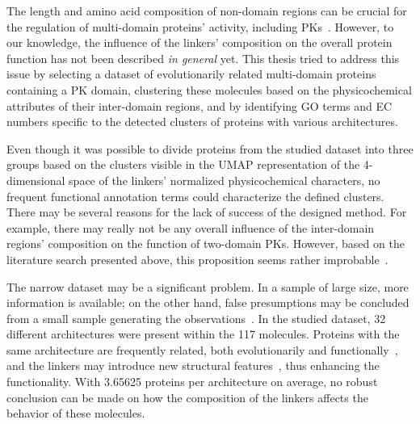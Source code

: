 \label{discussion}

The length and amino acid composition of non-domain regions can be crucial for the
regulation of multi-domain proteins' activity, including
PKs~\cite{gogl2019disordered, vigil2004conformational}.
However, to our knowledge, the influence of the linkers' composition on the overall
protein function has not been described \emph{in general} yet.
This thesis tried to address this issue by selecting a dataset of evolutionarily related
multi-domain proteins containing a PK domain, clustering these molecules based on the
physicochemical attributes of their inter-domain regions, and by identifying GO terms and
EC numbers specific to the detected clusters of proteins with various architectures.

Even though it was possible to divide proteins from the studied dataset into three groups
based on the clusters visible in the UMAP representation of the 4-dimensional space of
the linkers' normalized physicochemical characters, no frequent functional annotation
terms could characterize the defined clusters.
There may be several reasons for the lack of success of the designed method.
For example, there may really not be any overall influence of the inter-domain regions'
composition on the function of two-domain PKs.
However, based on the literature search presented above, this proposition seems rather
improbable~\cite{winkler1977tomato, van1997linker, ikebe1998hinge, robinson1998optimizing,
rice1999structural, gokhale2000role, case2000role, pufall2002autoinhibitory,
khalil2008kinesin, hariharan2009insights, smock2010interdomain, liu2010molecular,
shastry2010neck, ma2011dynamic, cyrus2011impact, kalodimos2011nmr, pohane2015modulation,
klement2015effect, rozycki2017length, jakubec2018widespread, gogl2019disordered}.

The narrow dataset may be a significant problem.
In a sample of large size, more information is available; on the other hand, false
presumptions may be concluded from a small sample generating the
observations~\cite{tanaka1987big, hua2005optimal}.
In the studied dataset, 32 different architectures were present within the 117 molecules.
Proteins with the same architecture are frequently related, both evolutionarily and
functionally~\cite{vogel2004structure, hegyi2001annotation, bashton2002geometry}, and the
linkers may introduce new structural features~\cite{papaleo2016role}, thus enhancing the
functionality.
With 3.65625 proteins per architecture on average, no robust conclusion can be made on how
the composition of the linkers affects the behavior of these molecules.

